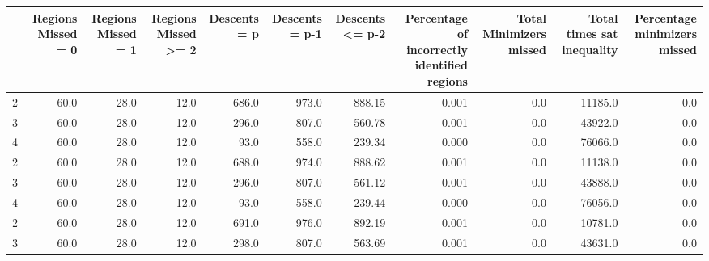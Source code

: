 \begin{tabular}{lrrrrrrrrrr}
\toprule
{} &  Regions Missed = 0 &  Regions Missed = 1 &  Regions Missed >= 2 &  Descents = p &  Descents = p-1 &  Descents <= p-2 &  Percentage of incorrectly identified regions &  Total Minimizers missed &  Total times sat inequality &  Percentage minimizers missed \\
\midrule
2 &                60.0 &                28.0 &                 12.0 &         686.0 &           973.0 &           888.15 &                                         0.001 &                      0.0 &                     11185.0 &                           0.0 \\
3 &                60.0 &                28.0 &                 12.0 &         296.0 &           807.0 &           560.78 &                                         0.001 &                      0.0 &                     43922.0 &                           0.0 \\
4 &                60.0 &                28.0 &                 12.0 &          93.0 &           558.0 &           239.34 &                                         0.000 &                      0.0 &                     76066.0 &                           0.0 \\
2 &                60.0 &                28.0 &                 12.0 &         688.0 &           974.0 &           888.62 &                                         0.001 &                      0.0 &                     11138.0 &                           0.0 \\
3 &                60.0 &                28.0 &                 12.0 &         296.0 &           807.0 &           561.12 &                                         0.001 &                      0.0 &                     43888.0 &                           0.0 \\
4 &                60.0 &                28.0 &                 12.0 &          93.0 &           558.0 &           239.44 &                                         0.000 &                      0.0 &                     76056.0 &                           0.0 \\
2 &                60.0 &                28.0 &                 12.0 &         691.0 &           976.0 &           892.19 &                                         0.001 &                      0.0 &                     10781.0 &                           0.0 \\
3 &                60.0 &                28.0 &                 12.0 &         298.0 &           807.0 &           563.69 &                                         0.001 &                      0.0 &                     43631.0 &                           0.0 \\

\end{tabular}
